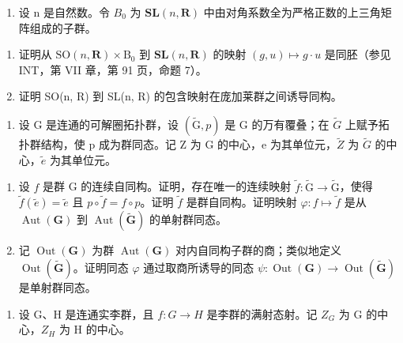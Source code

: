 \begin{enumerate}
\def\labelenumi{\arabic{enumi})}
\setcounter{enumi}{3}
\tightlist
\item
  设 n 是自然数。令 \(B_{0}\) 为 \(\mathbf{SL}(n,\mathbf{R})\) 中由对角系数全为严格正数的上三角矩阵组成的子群。
\end{enumerate}

\begin{enumerate}
\def\labelenumi{\alph{enumi})}
\item
  证明从 \(\mathrm{SO}(n,\mathbf{R})\times\mathrm{B}_{0}\) 到 \(\mathbf{SL}(n,\mathbf{R})\) 的映射 \((g,u)\mapsto g\cdot u\) 是同胚（参见 INT，第 VII 章，第 91 页，命题 7）。
\item
  证明 SO(n, R) 到 SL(n, R) 的包含映射在庞加莱群之间诱导同构。
\end{enumerate}

\begin{enumerate}
\def\labelenumi{\arabic{enumi})}
\setcounter{enumi}{4}
\tightlist
\item
  设 G 是连通的可解圈拓扑群，设 \((\widetilde{\mathrm{G}}, p)\) 是 G 的万有覆叠；在 \(\widetilde{G}\) 上赋予拓扑群结构，使 p 成为群同态。记 Z 为 G 的中心，e 为其单位元，\(\widetilde{Z}\) 为 \(\widetilde{G}\) 的中心，\(\widetilde{e}\) 为其单位元。
\end{enumerate}

\begin{enumerate}
\def\labelenumi{\alph{enumi})}
\item
  设 \(f\) 是群 G 的连续自同构。证明，存在唯一的连续映射 \(\widetilde{f} \colon \widetilde{\mathrm{G}} \to \widetilde{\mathrm{G}}\)，使得 \(\widetilde{f}(\widetilde{e}) = \widetilde{e}\) 且 \(p \circ \widetilde{f} = f \circ p\)。证明 \(\widetilde{f}\) 是群自同构。证明映射 \(\varphi \colon f \mapsto \widetilde{f}\) 是从 \(\operatorname{Aut}(\mathbf{G})\) 到 \(\operatorname{Aut}(\widetilde{\mathbf{G}})\) 的单射群同态。
\item
  记 \(\operatorname{Out}(\mathbf{G})\) 为群 \(\operatorname{Aut}(\mathbf{G})\) 对内自同构子群的商；类似地定义 \(\operatorname{Out}(\widetilde{\mathbf{G}})\)。证明同态 \(\varphi\) 通过取商所诱导的同态 \(\psi\colon\operatorname{Out}(\mathbf{G})\to\operatorname{Out}(\widetilde{\mathbf{G}})\) 是单射群同态。
\end{enumerate}

\begin{enumerate}
\def\labelenumi{\arabic{enumi})}
\setcounter{enumi}{5}
\tightlist
\item
  设 G、H 是连通实李群，且 \(f: G \to H\) 是李群的满射态射。记 \(Z_{G}\) 为 G 的中心，\(Z_{H}\) 为 H 的中心。
\end{enumerate}

